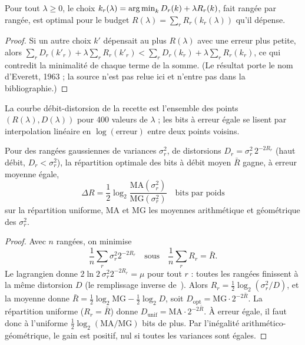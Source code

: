 \begin{proposition}\label{t3gen:prop:everett}
Pour tout $\lambda \ge 0$, le choix $k_r(\lambda) = \operatorname*{arg\,min}_k D_r(k) + \lambda R_r(k)$, fait rangée par rangée, est optimal pour le budget $R(\lambda) = \sum_r R_r(k_r(\lambda))$ qu'il dépense.
\end{proposition}

\begin{proof}
Si un autre choix $k'$ dépensait au plus $R(\lambda)$ avec une erreur plus petite, alors $\sum_r D_r(k'_r) + \lambda \sum_r R_r(k'_r) < \sum_r D_r(k_r) + \lambda \sum_r R_r(k_r)$, ce qui contredit la minimalité de chaque terme de la somme. (Le résultat porte le nom d'Everett, 1963 ; la source n'est pas relue ici et n'entre pas dans la bibliographie.)
\end{proof}

La courbe débit-distorsion de la recette est l'ensemble des points $(R(\lambda), D(\lambda))$ pour 400 valeurs de $\lambda$ ; les bits à erreur égale se lisent par interpolation linéaire en $\log(\text{erreur})$ entre deux points voisins.

\begin{proposition}\label{t3gen:prop:remplissage}
Pour des rangées gaussiennes de variances $\sigma_r^2$, de distorsions $D_r = \sigma_r^2\, 2^{-2R_r}$ (haut débit, $D_r < \sigma_r^2$), la répartition optimale des bits à débit moyen $\bar R$ gagne, à erreur moyenne égale,
\begin{equation}\label{t3gen:eq:remplissage}
\Delta R = \frac12 \log_2 \frac{\mathrm{MA}(\sigma_r^2)}{\mathrm{MG}(\sigma_r^2)} \quad \text{bits par poids}
\end{equation}
sur la répartition uniforme, MA et MG les moyennes arithmétique et géométrique des $\sigma_r^2$.
\end{proposition}

\begin{proof}
Avec $n$ rangées, on minimise
\[ \frac1n\sum_r \sigma_r^2 2^{-2R_r} \quad \text{sous} \quad \frac1n\sum_r R_r = \bar R . \]
Le lagrangien donne $2\ln 2\ \sigma_r^2 2^{-2R_r} = \mu$ pour tout $r$ : toutes les rangées finissent à la même distorsion $D$ (le remplissage inverse de~\cite[§\,10.3.3]{cover2006}). Alors $R_r = \frac12 \log_2(\sigma_r^2/D)$, et la moyenne donne $\bar R = \frac12 \log_2 \mathrm{MG} - \frac12 \log_2 D$, soit $D_{\mathrm{opt}} = \mathrm{MG}\cdot 2^{-2\bar R}$. La répartition uniforme ($R_r = \bar R$) donne $D_{\mathrm{unif}} = \mathrm{MA}\cdot 2^{-2\bar R}$. À erreur égale, il faut donc à l'uniforme $\frac12\log_2(\mathrm{MA}/\mathrm{MG})$ bits de plus. Par l'inégalité arithmético-géométrique, le gain est positif, nul si toutes les variances sont égales.
\end{proof}

